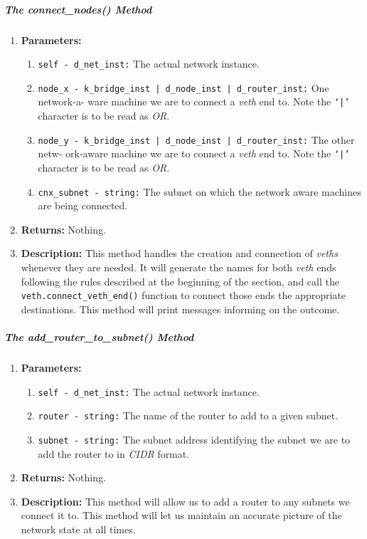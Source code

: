         \subparagraph{The connect\_nodes() Method}
            \begin{enumerate}
                \item \textbf{Parameters:}
                \begin{enumerate}
                    \item \texttt{self - d\_net\_inst:} The actual network instance.
                    \item \texttt{node\_x - k\_bridge\_inst | d\_node\_inst | d\_router\_inst:} One network-a- ware machine we are to connect a \textit{veth} end to. Note the \texttt{`|'} character is to be read as \textit{OR}.
                    \item \texttt{node\_y - k\_bridge\_inst | d\_node\_inst | d\_router\_inst:} The other netw- ork-aware machine we are to connect a \textit{veth} end to. Note the \texttt{`|'} character is to be read as \textit{OR}.
                    \item \texttt{cnx\_subnet - string:} The subnet on which the network aware machines are being connected.
                \end{enumerate}
                \item \textbf{Returns:} Nothing.
                \item \textbf{Description:} This method handles the creation and connection of \textit{veths} whenever they are needed. It will generate the names for both \textit{veth} ends following the rules described at the beginning of the section, and call the \texttt{veth.connect\_veth\_end()} function to connect those ends the appropriate destinations. This method will print messages informing on the outcome.
            \end{enumerate}

        \subparagraph{The add\_router\_to\_subnet() Method}
            \begin{enumerate}
                \item \textbf{Parameters:}
                \begin{enumerate}
                    \item \texttt{self - d\_net\_inst:} The actual network instance.
                    \item \texttt{router - string:} The name of the router to add to a given subnet.
                    \item \texttt{subnet - string:} The subnet address identifying the subnet we are to add the router to in \textit{CIDR} format.
                \end{enumerate}
                \item \textbf{Returns:} Nothing.
                \item \textbf{Description:} This method will allow us to add a router to any subnets we connect it to. This method will let us maintain an accurate picture of the network state at all times.
            \end{enumerate}

